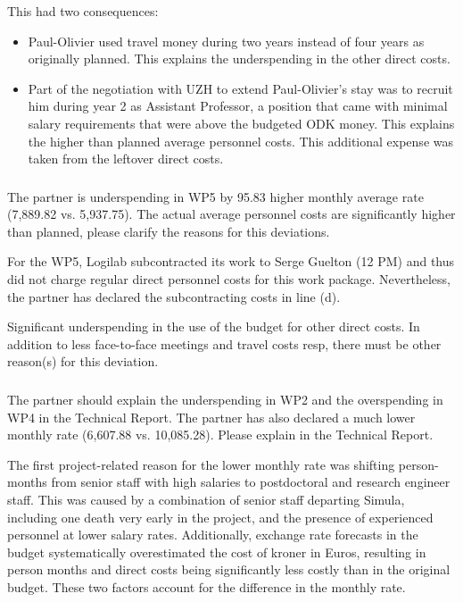 This had two consequences:
\begin{itemize}
\item Paul-Olivier used travel money during two years instead of four
  years as originally planned. This explains the underspending in the
  other direct costs.
\item Part of the negotiation with UZH to extend Paul-Olivier's stay
  was to recruit him during year 2 as Assistant Professor, a position
  that came with minimal salary requirements that were above the
  budgeted ODK money. This explains the higher than planned average
  personnel costs. This additional expense was taken from the leftover
  direct costs.
\end{itemize}

\subsubsection{}
\begin{EUcomment}
  The partner is underspending in WP5 by 95.83%
  higher monthly average rate (7,889.82 vs. 5,937.75). The actual
  average personnel costs are significantly higher than planned,
  please clarify the reasons for this deviations.
\end{EUcomment}
For the WP5, Logilab subcontracted its work to Serge Guelton (12 PM) and thus  did not charge regular direct personnel costs for this work package. Nevertheless, the partner has declared the subcontracting costs in line (d).

\begin{EUcomment}
  Significant underspending in the use of the budget for other direct
  costs. In addition to less face-to-face meetings and travel costs
  resp, there must be other reason(s) for this deviation.
\end{EUcomment}

\subsubsection{}
\begin{EUcomment}
  The partner should explain the underspending in WP2 and the
  overspending in WP4 in the Technical Report. The partner has also
  declared a much lower monthly rate (6,607.88 vs. 10,085.28). Please
  explain in the Technical Report.
\end{EUcomment}
The first project-related reason for the lower monthly rate was shifting person-months from senior staff with high salaries
to postdoctoral and research engineer staff.
This was caused by a combination of senior staff departing Simula, including one death very early in the project,
and the presence of experienced personnel at lower salary rates.
Additionally, exchange rate forecasts in the budget systematically overestimated the cost of kroner in Euros,
resulting in person months and direct costs being significantly less costly than in the original budget.
These two factors account for the difference in the monthly rate.

